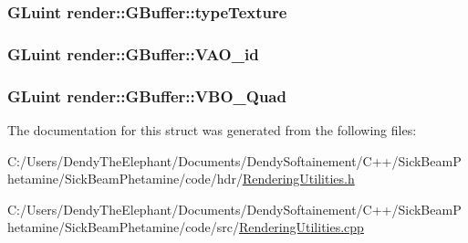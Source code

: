 \subsubsection[{\texorpdfstring{type\+Texture}{typeTexture}}]{\setlength{\rightskip}{0pt plus 5cm}G\+Luint render\+::\+G\+Buffer\+::type\+Texture}\hypertarget{structrender_1_1_g_buffer_a52dce2b24bb04fe0e900f3e580018520}{}\label{structrender_1_1_g_buffer_a52dce2b24bb04fe0e900f3e580018520}
\subsubsection[{\texorpdfstring{V\+A\+O\+\_\+id}{VAO_id}}]{\setlength{\rightskip}{0pt plus 5cm}G\+Luint render\+::\+G\+Buffer\+::\+V\+A\+O\+\_\+id}\hypertarget{structrender_1_1_g_buffer_ad88a76d003bb3001a135ab7e90e3ed1e}{}\label{structrender_1_1_g_buffer_ad88a76d003bb3001a135ab7e90e3ed1e}
\subsubsection[{\texorpdfstring{V\+B\+O\+\_\+\+Quad}{VBO_Quad}}]{\setlength{\rightskip}{0pt plus 5cm}G\+Luint render\+::\+G\+Buffer\+::\+V\+B\+O\+\_\+\+Quad}\hypertarget{structrender_1_1_g_buffer_a6c38cbbcbe0e88af725d91a6eb54567d}{}\label{structrender_1_1_g_buffer_a6c38cbbcbe0e88af725d91a6eb54567d}


The documentation for this struct was generated from the following files\+:\begin{DoxyCompactItemize}
\item 
C\+:/\+Users/\+Dendy\+The\+Elephant/\+Documents/\+Dendy\+Softainement/\+C++/\+Sick\+Beam\+Phetamine/\+Sick\+Beam\+Phetamine/code/hdr/\hyperlink{_rendering_utilities_8h}{Rendering\+Utilities.\+h}\item 
C\+:/\+Users/\+Dendy\+The\+Elephant/\+Documents/\+Dendy\+Softainement/\+C++/\+Sick\+Beam\+Phetamine/\+Sick\+Beam\+Phetamine/code/src/\hyperlink{_rendering_utilities_8cpp}{Rendering\+Utilities.\+cpp}\end{DoxyCompactItemize}
